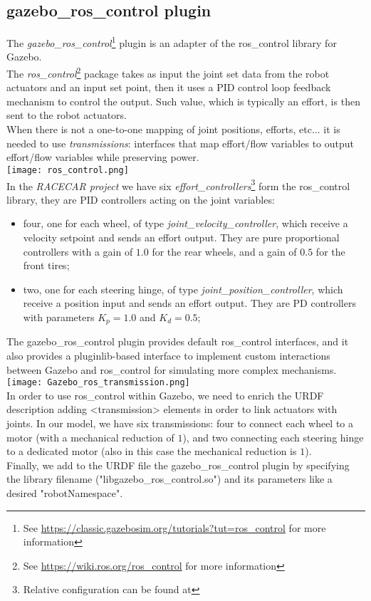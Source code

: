 \subsection{gazebo\_ros\_control plugin}
The \textit{gazebo\_ros\_control}\footnote{See \url{https://classic.gazebosim.org/tutorials?tut=ros_control} for more information}
plugin is an adapter of the ros\_control library for Gazebo.\\
The \textit{ros\_control}\footnote{See \url{https://wiki.ros.org/ros_control} for more information} 
package takes as input the joint set data from the robot actuators and an input set point, then it
uses a PID control loop feedback mechanism to control the output. Such value, which is typically an effort,
is then sent to the robot actuators. \\
When there is not a one-to-one mapping of joint positions, efforts, etc... it is needed to use \textit{transmissions}:
interfaces that map effort/flow variables to output effort/flow variables while preserving power. \\
\texttt{[image: ros\_control.png]}\\
In the \textit{RACECAR project} we have six \textit{effort\_controllers}\footnote{Relative configuration can be found at 
} form the ros\_control library,
they are PID controllers acting on the joint variables:
\begin{itemize}
    \item four, one for each wheel, of type \textit{joint\_velocity\_controller}, which receive a velocity setpoint
          and sends an effort output. They are pure proportional controllers with a gain of $1.0$ for the rear wheels, 
          and a gain of $0.5$ for the front tires;  
    \item two, one for each steering hinge, of type \textit{joint\_position\_controller}, which receive a position 
          input and sends an effort output. They are PD controllers with parameters $K_p = 1.0$ and $K_d = 0.5$;
\end{itemize}

The gazebo\_ros\_control plugin provides default ros\_control interfaces, and it also provides a pluginlib-based
interface to implement custom interactions between Gazebo and ros\_control for simulating more complex mechanisms.\\
\texttt{[image: Gazebo\_ros\_transmission.png]}\\
In order to use ros\_control within Gazebo, we need to enrich the URDF description adding <transmission> elements
in order to link actuators with joints. In our model, we have six transmissions: four to connect each wheel to a 
motor (with a mechanical reduction of $1$), and two connecting each steering hinge to a dedicated motor (also in
this case the mechanical reduction is $1$). \\
Finally, we add to the URDF file the gazebo\_ros\_control plugin by specifying the library filename ("libgazebo\_ros\_control.so")
and its parameters like a desired "robotNamespace".

